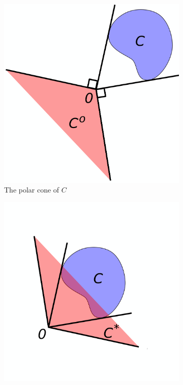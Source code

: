 \documentclass{beamerswitch}
\begin{document}
\begin{figure}[h!]
    \centering
    \begin{subfigure}[b]{0.3\textwidth}
        \centering
        \includegraphics[width=1\linewidth]{figs/Polar_cone_illustration.png}
        \caption{The polar cone of \(C\)}
        \label{fig:polar-cone}
    \end{subfigure}
    \begin{subfigure}[b]{0.3\textwidth}
        \centering
        \includegraphics[width=1\linewidth]{figs/Dual_cone_illustration.png}

\end{subfigure}
\end{figure}
\end{document}
